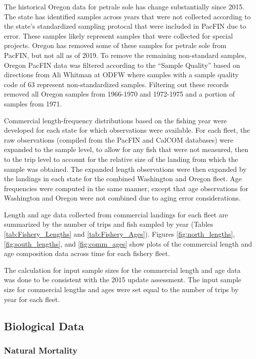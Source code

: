 \documentclass[12pt,]{article}
\begin{document}
The historical Oregon data for petrale sole has change substantially
since 2015. The state has identified samples across years that were not
collected according to the state's standardized sampling protocal that
were included in PacFIN due to error. These samples likely represent
samples that were collected for special projects. Oregon has removed
some of these samples for petrale sole from PacFIN, but not all as of
2019. To remove the remaining non-standard samples, Oregon PacFIN data
was filtered according to the ``Sample Quality'' based on directions
from Ali Whitman at ODFW where samples with a sample quality code of 63
represent non-standardized samples. Filtering out these records removed
all Oregon samples from 1966-1970 and 1972-1975 and a portion of samples
from 1971.

Commercial length-frequency distributions based on the fishing year were
developed for each state for which observations were available. For each
fleet, the raw observations (compiled from the PacFIN and CalCOM
databases) were expanded to the sample level, to allow for any fish that
were not measured, then to the trip level to account for the relative
size of the landing from which the sample was obtained. The expanded
length observations were then expanded by the landings in each state for
the combined Washington and Oregon fleet. Age frequencies were computed
in the same manner, except that age observations for Washington and
Oregon were not combined due to aging error considerations.

Length and age data collected from commercial landings for each fleet
are summarized by the number of trips and fish sampled by year (Tables
\ref{tab:Fishery_Lengths} and \ref{tab:Fishery_Ages}). Figures
\ref{fig:north_lengths}, \ref{fig:south_lengths}, and
\ref{fig:comm_ages} show plots of the commercial length and age
composition data across time for each fishery fleet.

The calculation for input sample sizes for the commercial length and age
data was done to be consistent with the 2015 update assessment. The
input sample size for commercial lengths and ages were set equal to the
number of trips by year for each fleet.

\subsection{Biological Data}\label{biological-data}

\subsubsection{Natural Mortality}\label{natural-mortality}
\end{document}
